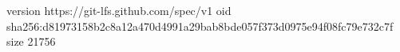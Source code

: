 version https://git-lfs.github.com/spec/v1
oid sha256:d81973158b2c8a12a470d4991a29bab8bde057f373d0975e94f08fc79e732c7f
size 21756
